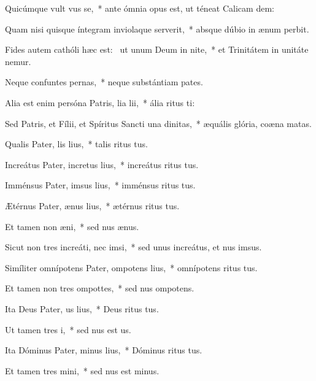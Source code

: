 \item Quicúmque vult vus se,~* ante ómnia opus est, ut téneat Calicam dem:
\item Quam nisi quisque íntegram inviolaque serverit,~* absque dúbio in ænum perbit.
\item Fides autem cathóli hæc est:~\pscross{} ut unum Deum in nite,~* et Trinitátem in unitáte nemur.
\item Neque confuntes pernas,~* neque substántiam pates.
\item Alia est enim persóna Patris, lia lii,~* ália ritus ti:
\item Sed Patris, et Fílii, et Spíritus Sancti una  dinitas,~* æquális glória, coæna matas.
\item Qualis Pater, lis lius,~* talis ritus tus.
\item Increátus Pater, incretus lius,~* increátus ritus tus.
\item Imménsus Pater, imsus lius,~* imménsus ritus tus.
\item Ætérnus Pater, ænus lius,~* ætérnus ritus tus.
\item Et tamen non  æni,~* sed nus ænus.
\item Sicut non tres increáti, nec  imsi,~* sed unus increátus, et nus imsus.
\item Simíliter omnípotens Pater, ompotens lius,~* omnípotens ritus tus.
\item Et tamen non tres ompottes,~* sed nus ompotens.
\item Ita Deus Pater, us lius,~* Deus ritus tus.
\item Ut tamen  tres i,~* sed nus est us.
\item Ita Dóminus Pater, minus lius,~* Dóminus ritus tus.
\item Et tamen  tres mini,~* sed nus est minus.
